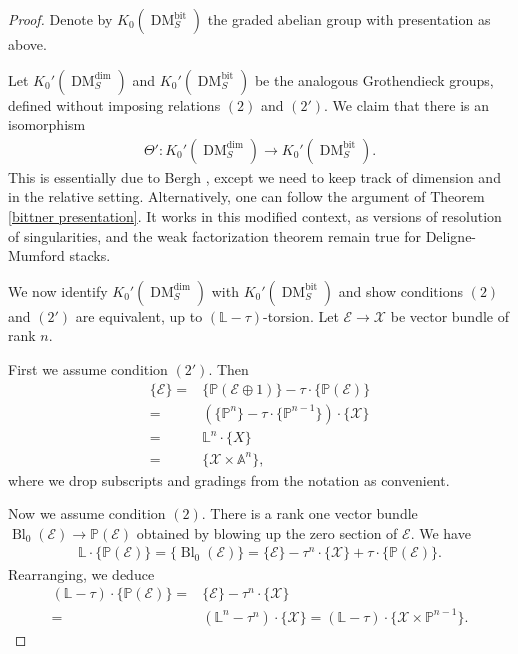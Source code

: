 \documentclass{amsart}
\theoremstyle{definition}
\DeclareMathOperator{\Bl}{Bl}
\DeclareMathOperator{\DM}{DM}
\DeclareMathOperator{\bit}{bit}
\numberwithin{equation}{section}
\begin{document}
\begin{proof}
Denote by $K_0(\DM_S^{\bit})$ the graded abelian group with presentation as above. 

Let $K_0'(\DM_S^{\dim})$ and $K_0'(\DM_S^{\bit})$ be the analogous Grothendieck groups, defined without imposing relations $(2)$ and $(2')$. We claim that there is an isomorphism
\begin{align*}
   \Theta': K_0'(\DM_S^{\dim}) \rightarrow K_0'(\DM_S^{\bit}).
\end{align*}
This is essentially due to Bergh \cite[Theorem $1.1$]{berghK0}, except we need to keep track of dimension and in the relative setting. Alternatively, one can follow the argument of Theorem \ref{bittner presentation}. It works in this modified context, as versions of resolution of singularities, and the weak factorization theorem remain true for Deligne-Mumford stacks.

We now identify $K_0'(\DM_S^{\dim})$ with $K_0'(\DM_S^{\bit})$ and show conditions $(2)$ and $(2')$ are equivalent, up to $(\mathbb{L}-\tau)$-torsion. Let $\mathscr{E} \rightarrow \mathscr{X}$ be vector bundle of rank $n$. 

First we assume condition $(2')$. Then
\begin{align*}
    \{ \mathscr{E} \} =& \{ \mathbb{P}(\mathscr{E} \oplus 1) \} - \tau \cdot \{ \mathbb{P}(\mathscr{E}) \} \\
    =& ( \{ \mathbb{P}^n \} - \tau \cdot \{ \mathbb{P}^{n-1} \}) \cdot \{ \mathscr{X} \} \\
    =& \mathbb{L}^n \cdot \{ X \} \\
    =& \{ \mathscr{X} \times \mathbb{A}^n \},
\end{align*}
where we drop subscripts and gradings from the notation as convenient.

Now we assume condition $(2)$. There is a rank one vector bundle $\Bl_0 (\mathscr{E}) \rightarrow \mathbb{P}(\mathscr{E})$ obtained by blowing up the zero section of $\mathscr{E}$. We have
\begin{align*}
    \mathbb{L} \cdot \{ \mathbb{P}(\mathscr{E}) \} = \{ \Bl_0(\mathscr{E}) \} = \{ \mathscr{E} \}  - \tau^n \cdot \{ \mathscr{X} \} +  \tau \cdot \{ \mathbb{P}(\mathscr{E}) \}.
\end{align*}
Rearranging, we deduce
\begin{align*}
    (\mathbb{L}-\tau) \cdot \{ \mathbb{P}(\mathscr{E}) \} =& \{ \mathscr{E} \}  - \tau^n \cdot \{ \mathscr{X} \}\\ =& (\mathbb{L}^n - \tau^n) \cdot \{ \mathscr{X} \} = (\mathbb{L}-\tau) \cdot \{ \mathscr{X} \times \mathbb{P}^{n-1} \}.
\end{align*}
\end{proof}
\end{document}
